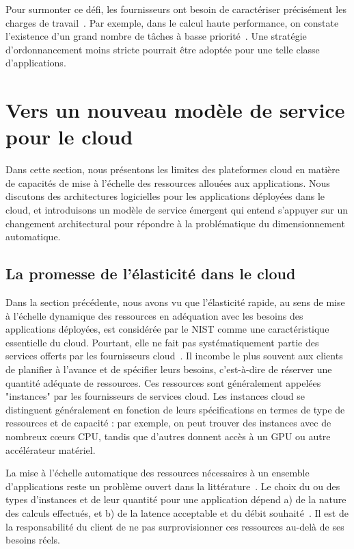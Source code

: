 Pour surmonter ce défi, les fournisseurs ont besoin de caractériser précisément les charges de travail~\cite{cortezResourceCentralUnderstanding2017a}. Par exemple, dans le calcul haute performance, on constate l'existence d'un grand nombre de tâches à basse priorité~\cite{tirmaziBorgNextGeneration2020}. Une stratégie d'ordonnancement moins stricte pourrait être adoptée pour une telle classe d'applications.

\section{Vers un nouveau modèle de service pour le cloud}

Dans cette section, nous présentons les limites des plateformes cloud en matière de capacités de mise à l'échelle des ressources allouées aux applications. Nous discutons des architectures logicielles pour les applications déployées dans le cloud, et introduisons un modèle de service émergent qui entend s'appuyer sur un changement architectural pour répondre à la problématique du dimensionnement automatique.

\subsection{La promesse de l'élasticité dans le cloud}

Dans la section précédente, nous avons vu que l'élasticité rapide, au sens de mise à l'échelle dynamique des ressources en adéquation avec les besoins des applications déployées, est considérée par le \gls{NIST} comme une caractéristique essentielle du cloud. Pourtant, elle ne fait pas systématiquement partie des services offerts par les fournisseurs cloud~\cite{herbstElasticityCloudComputing}. Il incombe le plus souvent aux clients de planifier à l'avance et de spécifier leurs besoins, c'est-à-dire de réserver une quantité adéquate de ressources. Ces ressources sont généralement appelées "instances" par les fournisseurs de services cloud. Les instances cloud se distinguent généralement en fonction de leurs spécifications en termes de type de ressources et de capacité : par exemple, on peut trouver des instances avec de nombreux cœurs \gls{CPU}, tandis que d'autres donnent accès à un \gls{GPU} ou autre accélérateur matériel.

La mise à l'échelle automatique des ressources nécessaires à un ensemble d'applications reste un problème ouvert dans la littérature~\cite{straesserWhyItNot2022}. Le choix du ou des types d'instances et de leur quantité pour une application dépend a) de la nature des calculs effectués, et b) de la latence acceptable et du débit souhaité~\cite{yallesRISCLESSReinforcementLearning}. Il est de la responsabilité du client de ne pas surprovisionner ces ressources au-delà de ses besoins réels.

